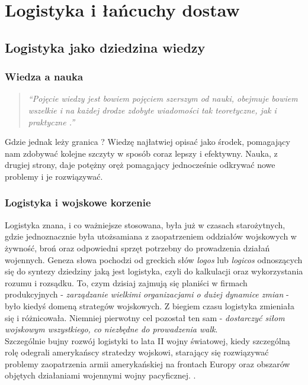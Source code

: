 \chapter{Logistyka i łańcuchy dostaw}
\label{c2:c2}

\section{Logistyka jako dziedzina wiedzy}
	\subsection{Wiedza a nauka}	
		\begin{quote}
			\textit{
				``Pojęcie wiedzy jest bowiem pojęciem szerszym od nauki,
				obejmuje bowiem wszelkie i na każdej drodze zdobyte wiadomości
				tak teoretyczne, jak i praktyczne \cite{organizacja_badan_ocen_prac_naukowych}.''
			}
		\end{quote}
		
		Gdzie jednak leży granica ? Wiedzę najłatwiej opisać jako środek, pomagający 
		nam zdobywać kolejne szczyty w sposób coraz lepszy i efektywny. Nauka, z drugiej strony,
		daje potężny oręż pomagający jednocześnie odkrywać nowe problemy i je rozwiązywać.
		
	\subsection{Logistyka i wojskowe korzenie}
		Logistyka znana, i co ważniejsze stosowana, była już w czasach starożytnych, gdzie jednoznacznie
		była utożsamiana z zaopatrzeniem oddziałów wojskowych w żywność, broń oraz odpowiedni
		sprzęt potrzebny do prowadzenia działań wojennych. Geneza słowa pochodzi od greckich
		słów \emph{logos} lub \emph{logicos} odnoszących się do syntezy dziedziny jaką jest logistyka,
		czyli do kalkulacji oraz wykorzystania rozumu i rozsądku. To, czym dzisiaj zajmują się planiści w 
		firmach produkcyjnych - \emph{zarządzanie wielkimi organizacjami o dużej dynamice zmian} - było kiedyś 
		domeną strategów wojskowych. Z biegiem czasu logistyka zmieniała się i różnicowała.
	    Niemniej pierwotny cel pozostał ten sam - 
		\emph{dostarczyć siłom wojskowym wszystkiego, co niezbędne do prowadzenia walk}. \\
		
		Szczególnie bujny rozwój logistyki to lata II wojny światowej, kiedy szczególną rolę
		odegrali amerykańscy stratedzy wojskowi, starający się rozwiązywać problemy zaopatrzenia
		armii amerykańskiej na frontach Europy oraz obszarów objętych działaniami wojennymi wojny pacyficznej. 
		\cite{logistyka_w_przedsiebiorstwie}\cite{logistyka_jako_dziedzina_wiedzy_cz1}.
		
